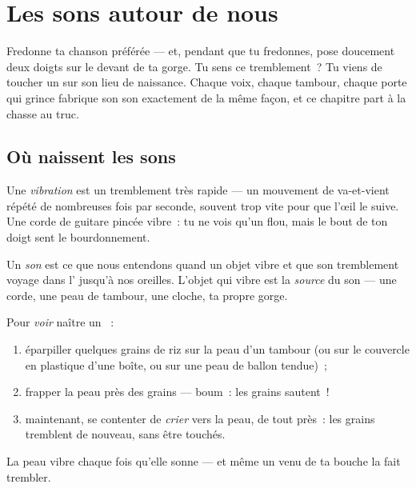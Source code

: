 \chapter{Les sons autour de nous}\label{ch:g3:sound-around-us}

Fredonne ta chanson préférée --- et, pendant que tu fredonnes, pose
doucement deux doigts sur le devant de ta gorge. Tu sens ce
tremblement~? Tu viens de toucher un  sur son lieu de naissance.
Chaque voix, chaque tambour, chaque porte qui grince fabrique son son
exactement de la même façon, et ce chapitre part à la chasse au truc.

\section{Où naissent les sons}

\begin{definition}[Vibration]\label{def:g3:sound-around-us:vibration}
Une \emph{vibration} est un tremblement très
rapide --- un mouvement de va-et-vient répété de nombreuses fois par
seconde, souvent trop vite pour que l'œil le suive. Une corde de
guitare pincée vibre~: tu ne vois qu'un flou, mais le bout de ton
doigt sent le bourdonnement.
\end{definition}

\begin{definition}[Son]\label{def:g3:sound-around-us:sound}
Un \emph{son} est ce que nous entendons quand un objet
vibre et que son tremblement voyage dans l' jusqu'à nos oreilles.
L'objet qui vibre est la \emph{source} du son --- une corde, une peau
de tambour, une cloche, ta propre gorge.
\end{definition}

\begin{method}\label{met:g3:sound-around-us:rice}
Pour \emph{voir} naître un ~:
\begin{enumerate}
  \item éparpiller quelques grains de riz sur la peau d'un tambour
        (ou sur le couvercle en plastique d'une boîte, ou sur une
        peau de ballon tendue)~;
  \item frapper la peau près des grains --- boum~: les grains
        sautent~!
  \item maintenant, se contenter de \emph{crier} vers la peau, de
        tout près~: les grains tremblent de nouveau, sans être
        touchés.
\end{enumerate}
La peau vibre chaque fois qu'elle sonne --- et même un  venu de ta
bouche la fait trembler.
\end{method}

